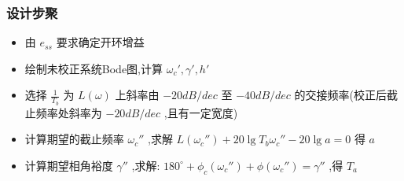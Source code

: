 \documentclass[table]{beamer}
\begin{document}
\begin{frame}
\frametitle{设计步聚}
\label{sec-1-3}

\begin{itemize}
\item 由 $e_{ss}$ 要求确定开环增益
\item 绘制未校正系统Bode图,计算 $\omega_c',\gamma',h'$
\item <2->选择  $\frac{1}{T_b}$  为  $L(\omega)$  上斜率由  $-20dB/dec$  至 $-40dB/dec$ 的交接频率(校正后截止频率处斜率为 $-20dB/dec$ ,且有一定宽度)
\item <3->计算期望的截止频率 $\omega_c''$ ,求解  $L(\omega_c'')+20\lg T_b\omega_c''-20\lg a=0$  得 $a$
\item <4->计算期望相角裕度 $\gamma''$ ,求解:  $180^\circ+\phi_c(\omega_c'')+\phi(\omega_c'')=\gamma''$  ,得 $T_a$
\end{itemize}
\end{frame}
\end{document}
